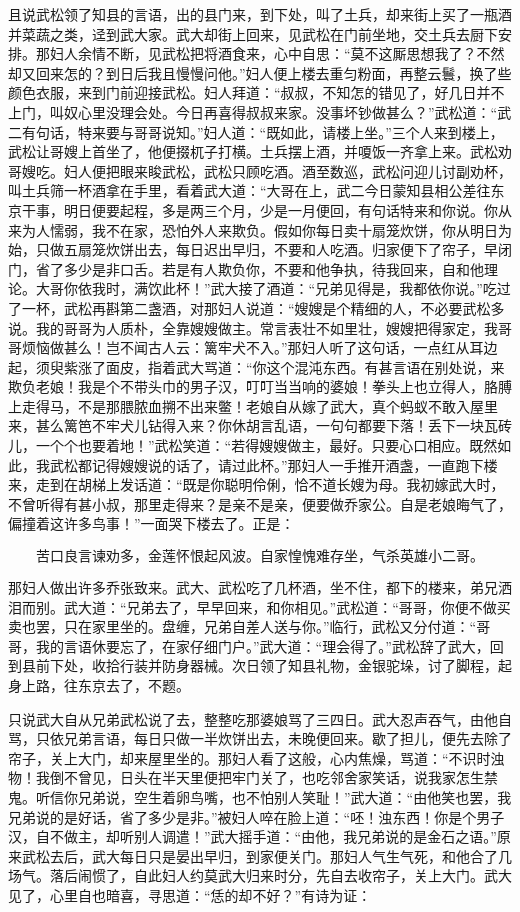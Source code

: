 且说武松领了知县的言语，出的县门来，到下处，叫了土兵，却来街上买了一瓶酒并菜蔬之类，迳到武大家。武大却街上回来，见武松在门前坐地，交土兵去厨下安排。那妇人余情不断，见武松把将酒食来，心中自思：“莫不这厮思想我了？不然却又回来怎的？到日后我且慢慢问他。”妇人便上楼去重匀粉面，再整云鬟，换了些颜色衣服，来到门前迎接武松。妇人拜道：“叔叔，不知怎的错见了，好几日并不上门，叫奴心里没理会处。今日再喜得叔叔来家。没事坏钞做甚么？”武松道：“武二有句话，特来要与哥哥说知。”妇人道：“既如此，请楼上坐。”三个人来到楼上，武松让哥嫂上首坐了，他便掇杌子打横。土兵摆上酒，并嗄饭一齐拿上来。武松劝哥嫂吃。妇人便把眼来睃武松，武松只顾吃酒。酒至数巡，武松问迎儿讨副劝杯，叫土兵筛一杯酒拿在手里，看着武大道：“大哥在上，武二今日蒙知县相公差往东京干事，明日便要起程，多是两三个月，少是一月便回，有句话特来和你说。你从来为人懦弱，我不在家，恐怕外人来欺负。假如你每日卖十扇笼炊饼，你从明日为始，只做五扇笼炊饼出去，每日迟出早归，不要和人吃酒。归家便下了帘子，早闭门，省了多少是非口舌。若是有人欺负你，不要和他争执，待我回来，自和他理论。大哥你依我时，满饮此杯！”武大接了酒道：“兄弟见得是，我都依你说。”吃过了一杯，武松再斟第二盏酒，对那妇人说道：“嫂嫂是个精细的人，不必要武松多说。我的哥哥为人质朴，全靠嫂嫂做主。常言表壮不如里壮，嫂嫂把得家定，我哥哥烦恼做甚么！岂不闻古人云：篱牢犬不入。”那妇人听了这句话，一点红从耳边起，须臾紫涨了面皮，指着武大骂道：“你这个混沌东西。有甚言语在别处说，来欺负老娘！我是个不带头巾的男子汉，叮叮当当响的婆娘！拳头上也立得人，胳膊上走得马，不是那腲脓血搠不出来鳖！老娘自从嫁了武大，真个蚂蚁不敢入屋里来，甚么篱笆不牢犬儿钻得入来？你休胡言乱语，一句句都要下落！丢下一块瓦砖儿，一个个也要着地！”武松笑道：“若得嫂嫂做主，最好。只要心口相应。既然如此，我武松都记得嫂嫂说的话了，请过此杯。”那妇人一手推开酒盏，一直跑下楼来，走到在胡梯上发话道：“既是你聪明伶俐，恰不道长嫂为母。我初嫁武大时，不曾听得有甚小叔，那里走得来？是亲不是亲，便要做乔家公。自是老娘晦气了，偏撞着这许多鸟事！”一面哭下楼去了。正是：

\[
苦口良言谏劝多，金莲怀恨起风波。
自家惶愧难存坐，气杀英雄小二哥。
\]

那妇人做出许多乔张致来。武大、武松吃了几杯酒，坐不住，都下的楼来，弟兄洒泪而别。武大道：“兄弟去了，早早回来，和你相见。”武松道：“哥哥，你便不做买卖也罢，只在家里坐的。盘缠，兄弟自差人送与你。”临行，武松又分付道：“哥哥，我的言语休要忘了，在家仔细门户。”武大道：“理会得了。”武松辞了武大，回到县前下处，收拾行装并防身器械。次日领了知县礼物，金银驼垛，讨了脚程，起身上路，往东京去了，不题。

只说武大自从兄弟武松说了去，整整吃那婆娘骂了三四日。武大忍声吞气，由他自骂，只依兄弟言语，每日只做一半炊饼出去，未晚便回来。歇了担儿，便先去除了帘子，关上大门，却来屋里坐的。那妇人看了这般，心内焦燥，骂道：“不识时浊物！我倒不曾见，日头在半天里便把牢门关了，也吃邻舍家笑话，说我家怎生禁鬼。听信你兄弟说，空生着卵鸟嘴，也不怕别人笑耻！”武大道：“由他笑也罢，我兄弟说的是好话，省了多少是非。”被妇人啐在脸上道：“呸！浊东西！你是个男子汉，自不做主，却听别人调遣！”武大摇手道：“由他，我兄弟说的是金石之语。”原来武松去后，武大每日只是晏出早归，到家便关门。那妇人气生气死，和他合了几场气。落后闹惯了，自此妇人约莫武大归来时分，先自去收帘子，关上大门。武大见了，心里自也暗喜，寻思道：“恁的却不好？”有诗为证：

